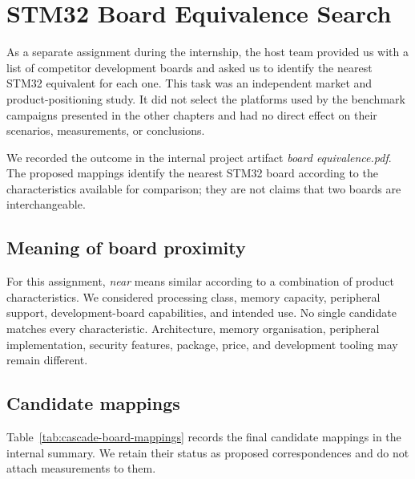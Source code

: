 \chapter{STM32 Board Equivalence Search}
\label{chap:cascade-board-equivalence}

As a separate assignment during the internship, the host team provided us with a list of
competitor development boards and asked us to identify the nearest STM32 equivalent for
each one. This task was an independent market and product-positioning study. It did not
select the platforms used by the benchmark campaigns presented in the other chapters and
had no direct effect on their scenarios, measurements, or conclusions.

We recorded the outcome in the internal project artifact \emph{board equivalence.pdf}.
The proposed mappings identify the nearest STM32 board according to the characteristics
available for comparison; they are not claims that two boards are interchangeable.

\section{Meaning of board proximity}
\label{sec:cascade-equivalence-method}

For this assignment, \emph{near} means similar according to a combination of product
characteristics. We considered processing class, memory capacity, peripheral support,
development-board capabilities, and intended use. No single candidate matches every
characteristic. Architecture, memory organisation, peripheral implementation, security
features, package, price, and development tooling may remain different.

\section{Candidate mappings}
\label{sec:cascade-equivalence-mappings}

Table~\ref{tab:cascade-board-mappings} records the final candidate mappings in the internal
summary. We retain their status as proposed correspondences and do not attach measurements
to them.

